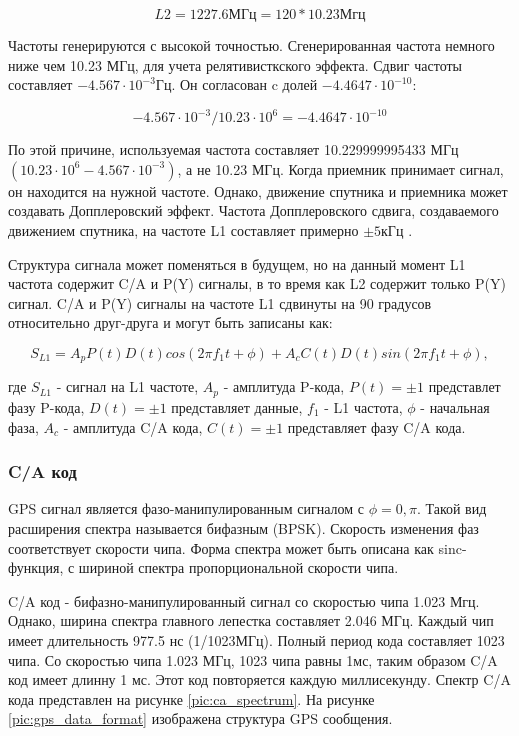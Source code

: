 \begin{equation}
L2=1227.6\mbox{МГц}=120*10.23\mbox{Мгц}
\label{eq:l2_freq}
\end{equation}

Частоты генерируются с высокой точностью. Сгенерированная частота немного ниже чем 10.23 МГц, для учета 
релятивисткского эффекта. Сдвиг частоты составляет ${-4.567\cdot10^{-3}\mbox{Гц}}$. Он согласован c долей
${-4.4647\cdot10^{-10}}$:

\begin{equation}
-4.567\cdot10^{-3}/10.23\cdot10^{6} = -4.4647\cdot10^{-10}
\end{equation}

По этой причине, используемая частота составляет 10.229999995433 МГц ${(10.23\cdot10^{6} - 4.567\cdot10^{-3})}$,
а не 10.23 МГц. Когда приемник принимает сигнал, он находится
на нужной частоте. Однако, движение спутника и приемника может создавать Допплеровский эффект. Частота Допплеровского
сдвига, создаваемого движением спутника, на частоте L1 составляет примерно ${\pm5\mbox{кГц}}$ \cite{yacenkov, tsui}.

Структура сигнала может поменяться в будущем, но на данный момент L1 частота содержит C/A и P(Y) сигналы, в то
время как L2 содержит только P(Y) сигнал. C/A и P(Y) сигналы на частоте L1 сдвинуты на 90 градусов
относительно друг-друга и могут быть записаны как:

\begin{equation}
S_{L1}=A_p P(t) D(t) cos(2\pi f_1 t + \phi) + A_c C(t) D(t) sin(2\pi f_1 t + \phi),
\label{eq:s_l1}
\end{equation}

где ${S_{L1}}$ - сигнал на L1 частоте, ${A_p}$ - амплитуда P-кода, ${P(t)=\pm 1}$ представлет фазу P-кода,
${D(t) = \pm 1}$ представляет данные, ${f_1}$ - L1 частота, ${\phi}$ - начальная фаза, ${A_c}$ - амплитуда C/A кода,
${C(t)} = \pm 1$ представляет фазу C/A кода.

\subsubsection*{C/A код}
GPS сигнал является фазо-манипулированным сигналом с ${\phi = 0, \pi}$. Такой вид расширения спектра называется бифазным 
(BPSK). Скорость изменения фаз соответствует скорости чипа. Форма спектра может быть описана как sinc-функция,
с шириной спектра пропорциональной скорости чипа. 

C/A код - бифазно-манипулированный сигнал со скоростью чипа 1.023 Мгц. Однако, ширина спектра главного лепестка составляет
2.046 МГц. Каждый чип имеет длительность 977.5 нс (1/1023МГц). Полный период кода составляет 1023 чипа. Со скоростью
чипа 1.023 МГц, 1023 чипа равны 1мс, таким образом C/A код имеет длинну 1 мс. Этот код повторяется каждую миллисекунду.
Спектр C/A кода представлен на рисунке \ref{pic:ca_spectrum}. На рисунке \ref{pic:gps_data_format} изображена структура GPS сообщения. 

